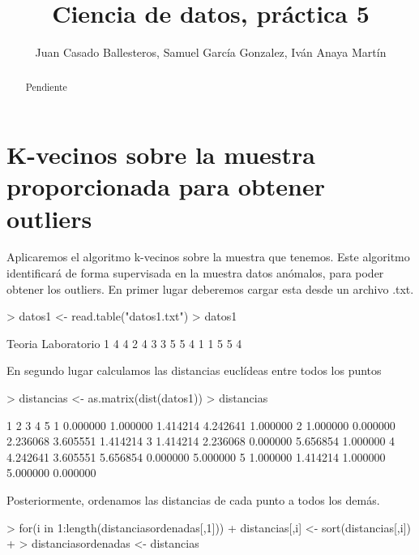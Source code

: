 \documentclass [a4paper] {article}
\title{Ciencia de datos, práctica 5}
\author{Juan Casado Ballesteros, Samuel García Gonzalez, Iván Anaya Martín}
\begin{document}
\maketitle

\begin{abstract}
Pendiente
\end{abstract}

\newpage

\newpage
\section{K-vecinos sobre la muestra proporcionada para obtener outliers}

Aplicaremos el algoritmo k-vecinos sobre la muestra que tenemos.
Este algoritmo identificará de forma supervisada en la muestra datos anómalos, para poder obtener los outliers.
En primer lugar deberemos cargar esta desde un archivo .txt.
\begin{Schunk}
\begin{Sinput}
> datos1 <- read.table("datos1.txt")
> datos1
\end{Sinput}
\begin{Soutput}
  Teoria Laboratorio
1      4           4
2      4           3
3      5           5
4      1           1
5      5           4
\end{Soutput}
\end{Schunk}

En segundo lugar calculamos las distancias euclídeas entre todos los puntos
\begin{Schunk}
\begin{Sinput}
> distancias <- as.matrix(dist(datos1))
> distancias
\end{Sinput}
\begin{Soutput}
         1        2        3        4        5
1 0.000000 1.000000 1.414214 4.242641 1.000000
2 1.000000 0.000000 2.236068 3.605551 1.414214
3 1.414214 2.236068 0.000000 5.656854 1.000000
4 4.242641 3.605551 5.656854 0.000000 5.000000
5 1.000000 1.414214 1.000000 5.000000 0.000000
\end{Soutput}
\end{Schunk}

Posteriormente, ordenamos las distancias de cada punto a todos los demás.
\begin{Schunk}
\begin{Sinput}
> for(i in 1:length(distanciasordenadas[,1])){
+   distancias[,i] <- sort(distancias[,i])
+ }
> distanciasordenadas <- distancias
\end{Sinput}
\end{Schunk}
\end{document}
